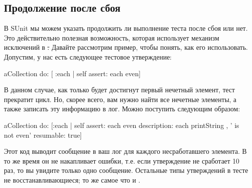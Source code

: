 \documentclass[a4paper,10pt,twoside]{book}
\begin{document}
\subsection{Продолжение после сбоя}

В SUnit мы можем указать продолжить ли выполнение теста после сбоя или нет.
Это действительно полезная возможность, которая использует механизм исключений в \st.
Давайте рассмотрим пример, чтобы понять, как его использовать.
Допустим, у нас есть следующее тестовое утверждение:

\begin{code}{}
aCollection do: [ :each | self assert: each even]
\end{code}

В данном случае, как только будет достигнут первый нечетный элемент, тест прекратит цикл.
Но, скорее всего, вам нужно найти все нечетные элементы, 
а также записать эту информацию в лог. Можно поступить следующим образом:

\begin{code}{}
aCollection do:
	[:each |
	self
		assert: each even
		description: each printString , ' is not even'
		resumable: true]
\end{code}

Этот код выводит сообщение в ваш лог для каждого несработавшего элемента.
В то же время он не накапливает ошибки, т.е. если утверждение не сработает 10 раз,
то вы увидите только одно сообщение. Остальные типы утверждений в тесте не восстанавливающиеся;
 то же самое что и .
  
\end{document}
